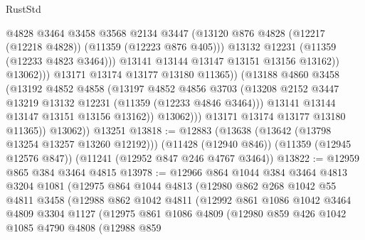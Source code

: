 \begin{lexlean}{RustStd}
\begin{coremodule}
{{{{{{{{{{{{{{{{{{{                                @4828
                                @3464
                                @3458
                                @3568
                                @2134
                                @3447
                                (@13120
                                  @876
                                  @4828
                                  (@12217 (@12218 @4828))
                                  (@11359 (@12223 @876 @405)))
                                @13132
                                @12231
                                (@11359 (@12233 @4823 @3464)))
                              @13141
                              @13144
                              @13147
                              @13151
                              @13156
                              @13162))
                          @13062)))
                    @13171
                    @13174
                    @13177
                    @13180
                    @11365))
                (@13188
                  @4860
                  @3458
                  (@13192
                    @4852
                    @4858
                    (@13197
                      @4852
                      @4856
                      @3703
                      (@13208 @2152 @3447 @13219 @13132 @12231 (@11359 (@12233 @4846 @3464)))
                      @13141
                      @13144
                      @13147
                      @13151
                      @13156
                      @13162))
                  @13062)))
            @13171
            @13174
            @13177
            @13180
            @11365))
        @13062))
    @13251
@13818 := @12883
    (@13638 (@13642 (@13798 @13254 @13257 @13260 @12192)))
    (@11428 (@12940 @846))
    (@11359 (@12945 @12576 @847))
    (@11241 (@12952 @847 @246 @4767 @3464))
@13822 := @12959 @865 @384 @3464 @4815
@13978 := @12966
    @864
    @1044
    @384
    @3464
    @4813
    @3204
    @1081
    (@12975
      @864
      @1044
      @4813
      (@12980
        @862
        @268
        @1042
        @55
        @4811
        @3458
        (@12988
          @862
          @1042
          @4811
          (@12992
            @861
            @1086
            @1042
            @3464
            @4809
            @3304
            @1127
            (@12975
              @861
              @1086
              @4809
              (@12980
                @859
                @426
                @1042
                @1085
                @4790
                @4808
                (@12988
                  @859
}}}}}}}}}}}}}}}}}}}
\end{coremodule}
\end{lexlean}
